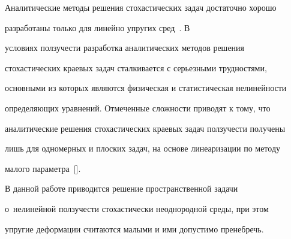 


\date{30.11.2007}



\address{\samgtu}











\maketitle





Аналитические методы решения стохастических задач достаточно хорошо

разработаны только для линейно упругих сред~\cite{Zabelin:bib:01}. В

условиях ползучести разработка аналитических методов решения

стохастических краевых задач сталкивается с серьезными трудностями,

основными из которых являются физическая и статистическая нелинейности

определяющих уравнений. Отмеченные сложности приводят к тому, что

аналитические решения стохастических краевых задач ползучести получены

лишь для одномерных и плоских задач, на основе линеаризации по методу

малого параметра~[].



В данной работе приводится решение пространственной задачи 

о~нелинейной ползучести стохастически неоднородной среды, при этом

упругие деформации считаются малыми и ими допустимо пренебречь.

